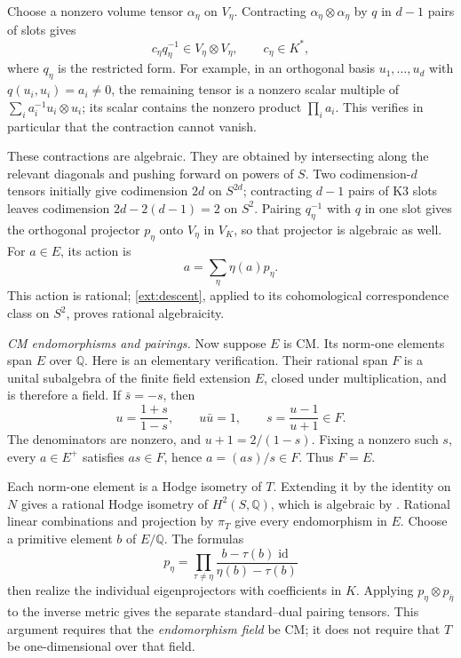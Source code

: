 \documentclass[11pt]{amsart}
\newcommand{\Q}{\mathbb Q}
\DeclareMathOperator{\id}{id}
\theoremstyle{definition}
\theoremstyle{remark}
\numberwithin{equation}{section}
\begin{document}
Choose a nonzero volume tensor $\alpha_\eta$ on $V_\eta$.
Contracting $\alpha_\eta\otimes\alpha_\eta$ by $q$ in $d-1$ pairs
of slots gives
\begin{equation}\label{ext:volume-contraction}
 c_\eta q_\eta^{-1}\in V_\eta\otimes V_\eta,
       \qquad c_\eta\in K^*,
\end{equation}
where $q_\eta$ is the restricted form.  For example, in an
orthogonal basis $u_1,\ldots,u_d$ with $q(u_i,u_i)=a_i\ne0$, the
remaining tensor is a nonzero scalar multiple of
$\sum_i a_i^{-1}u_i\otimes u_i$; its scalar contains the nonzero
product $\prod_i a_i$.  This verifies in particular that the
contraction cannot vanish.

These contractions are algebraic.  They are obtained by
intersecting along the relevant diagonals and pushing forward on
powers of $S$.  Two codimension-$d$ tensors initially give
codimension $2d$ on $S^{2d}$; contracting $d-1$ pairs of K3 slots
leaves codimension $2d-2(d-1)=2$ on $S^2$.  Pairing
$q_\eta^{-1}$ with $q$ in one slot gives the orthogonal projector
$p_\eta$ onto $V_\eta$ in $V_K$, so that projector is algebraic as
well.  For $a\in E$, its action is
\begin{equation}\label{ext:e-action}
 a=\sum_\eta\eta(a)p_\eta.
\end{equation}
This action is rational; \eqref{ext:descent}, applied to its
cohomological correspondence class on $S^2$, proves rational
algebraicity.

\emph{CM endomorphisms and pairings.}
Now suppose $E$ is CM.  Its norm-one elements span $E$ over $\Q$.
Here is an elementary verification.  Their rational span $F$ is a
unital subalgebra of the finite field extension $E$, closed under
multiplication, and is therefore a field.  If $\bar s=-s$, then
\[
 u=\frac{1+s}{1-s},\qquad u\bar u=1,\qquad
 s=\frac{u-1}{u+1}\in F.
\]
The denominators are nonzero, and $u+1=2/(1-s)$.  Fixing a nonzero
such $s$, every $a\in E^+$ satisfies $as\in F$, hence
$a=(as)/s\in F$.  Thus $F=E$.

Each norm-one element is a Hodge isometry of $T$.  Extending it by
the identity on $N$ gives a rational Hodge isometry of
$H^2(S,\Q)$, which is algebraic by
\cite[Theorem~1.1]{Buskin}.  Rational linear combinations and
projection by $\pi_T$ give every endomorphism in $E$.  Choose a
primitive element $b$ of $E/\Q$.  The formulas
\[
 p_\eta=\prod_{\tau\ne\eta}
       \frac{b-\tau(b)\id}{\eta(b)-\tau(b)}
\]
then realize the individual eigenprojectors with coefficients in
$K$.  Applying $p_\eta\otimes p_{\bar\eta}$ to the inverse metric
gives the separate standard--dual pairing tensors.  This argument
requires that the \emph{endomorphism field} be CM; it does not
require that $T$ be one-dimensional over that field.
\end{document}
